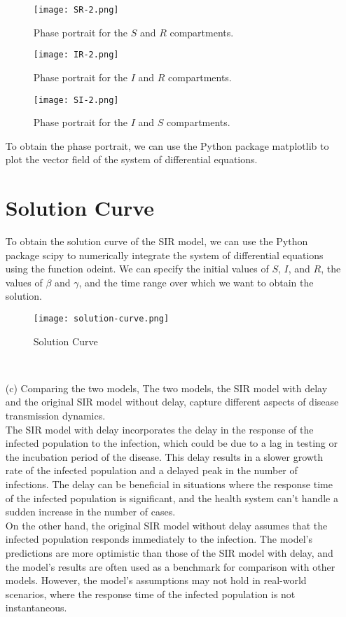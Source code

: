 \documentclass{article}
\begin{document}
\begin{enumerate}
\begin{figure}[htbp]
\centering
\begin{minipage}[b]{0.28\textwidth}
\texttt{[image: SR-2.png]}
\caption{Phase portrait for the $S$ and $R$ compartments.}
\end{minipage}
\hfill
\begin{minipage}[b]{0.23\textwidth}
\texttt{[image: IR-2.png]}
\caption{Phase portrait for the $I$ and $R$ compartments.}
\end{minipage}
\hfill
\begin{minipage}[b]{0.23\textwidth}
\texttt{[image: SI-2.png]}
\caption{Phase portrait for the $I$ and $S$ compartments.}
\end{minipage}
\end{figure}
To obtain the phase portrait, we can use the Python package matplotlib to plot the vector field of the system of differential equations.

\section{Solution Curve}
To obtain the solution curve of the SIR model, we can use the Python package scipy to numerically integrate the system of differential equations using the function odeint. We can specify the initial values of $S$, $I$, and $R$, the values of $\beta$ and $\gamma$, and the time range over which we want to obtain the solution.
\begin{figure}[htbp]
\centering
\texttt{[image: solution-curve.png]}
\caption{Solution Curve}
\label{fig:architecture}
\end{figure}
\\

\item[(c)] Comparing the two models, The two models, the SIR model with delay and the original SIR model without delay, capture different aspects of disease transmission dynamics.
\\
The SIR model with delay incorporates the delay in the response of the infected population to the infection, which could be due to a lag in testing or the incubation period of the disease. This delay results in a slower growth rate of the infected population and a delayed peak in the number of infections. The delay can be beneficial in situations where the response time of the infected population is significant, and the health system can't handle a sudden increase in the number of cases.
\\
On the other hand, the original SIR model without delay assumes that the infected population responds immediately to the infection. The model's predictions are more optimistic than those of the SIR model with delay, and the model's results are often used as a benchmark for comparison with other models. However, the model's assumptions may not hold in real-world scenarios, where the response time of the infected population is not instantaneous.\\


\end{enumerate}
\end{document}
